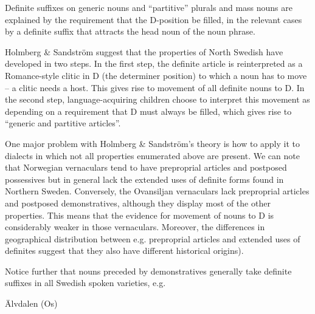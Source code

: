 \begin{styleBodytextC}
Definite suffixes on generic nouns and “partitive” plurals and mass nouns are explained by the requirement that the D-position be filled, in the relevant cases by a definite suffix that attracts the head noun of the noun phrase. 

\end{styleBodytextC}

\begin{styleBodytextC}
Holmberg \& Sandström suggest that the properties of North Swedish have developed in two steps. In the first step, the definite article is reinterpreted as a Romance-style clitic in D (the determiner position) to which a noun has to move – a clitic needs a host. This gives rise to movement of all definite nouns to D. In the second step, language-acquiring children choose to interpret this movement as depending on a requirement that D must always be filled, which gives rise to “generic and partitive articles”. 

\end{styleBodytextC}

\begin{styleBodytextC}
One major problem with Holmberg \& Sandström’s theory is how to apply it to dialects in which not all properties enumerated above are present. We can note that Norwegian vernaculars tend to have preproprial articles and postposed possessives but in general lack the extended uses of definite forms found in Northern Sweden. Conversely, the Ovansiljan vernaculars lack preproprial articles and postposed demonstratives, although they display most of the other properties. This means that the evidence for movement of nouns to D is considerably weaker in those vernaculars. Moreover, the differences in geographical distribution between e.g. preproprial articles and extended uses of definites suggest that they also have different historical origins). 

\end{styleBodytextC}

\begin{styleBodytextC}
Notice further that nouns preceded by demonstratives generally take definite suffixes in all Swedish spoken varieties, e.g.

\end{styleBodytextC}

\begin{listWWNumileveli}
\item {}

\begin{styleExample}
Älvdalen (Os)

\end{styleExample}

\end{listWWNumileveli}

